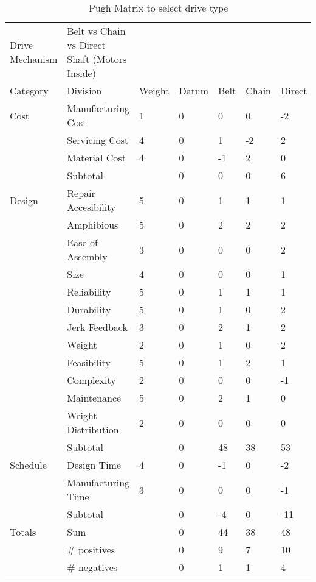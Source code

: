  \begin{table}
\centering
\caption{Pugh Matrix to select drive type}
\begin{tabular}{| lllllll |} \hline
Drive Mechanism & Belt vs Chain vs Direct Shaft (Motors Inside) &  &  &  &  & \\
Category & Division & Weight & Datum & Belt & Chain & Direct\\
Cost & Manufacturing Cost & 1 & 0 & 0 & 0 & -2\\
 & Servicing Cost & 4 & 0 & 1 & -2 & 2\\
 & Material Cost & 4 & 0 & -1 & 2 & 0\\
 & Subtotal &  & 0 & 0 & 0 & 6\\
Design & Repair Accesibility & 5 & 0 & 1 & 1 & 1\\
 & Amphibious & 5 & 0 & 2 & 2 & 2\\
 & Ease of Assembly & 3 & 0 & 0 & 0 & 2\\
 & Size & 4 & 0 & 0 & 0 & 1\\
 & Reliability & 5 & 0 & 1 & 1 & 1\\
 & Durability & 5 & 0 & 1 & 0 & 2\\
 & Jerk Feedback & 3 & 0 & 2 & 1 & 2\\
 & Weight  & 2 & 0 & 1 & 0 & 2\\
 & Feasibility & 5 & 0 & 1 & 2 & 1\\
 & Complexity & 2 & 0 & 0 & 0 & -1\\
 & Maintenance & 5 & 0 & 2 & 1 & 0\\
 & Weight Distribution & 2 & 0 & 0 & 0 & 0\\
 & Subtotal &  & 0 & 48 & 38 & 53\\
Schedule & Design Time & 4 & 0 & -1 & 0 & -2\\
 & Manufacturing Time & 3 & 0 & 0 & 0 & -1\\
 & Subtotal &  & 0 & -4 & 0 & -11\\
Totals & Sum &  & 0 & 44 & 38 & 48\\
 & \# positives &  & 0 & 9 & 7 & 10\\
 & \# negatives &  & 0 & 1 & 1 & 4\\
 \end{tabular}
 \label{tab:pugh_drive}
 \end{table}
 
